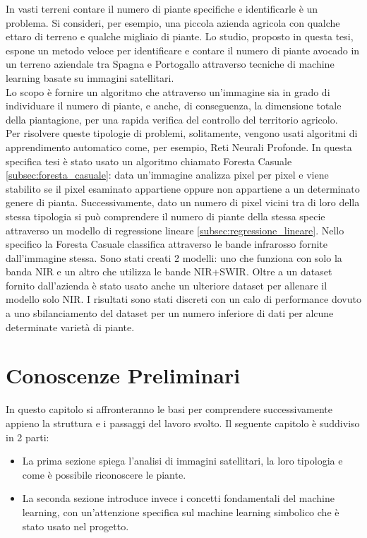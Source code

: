 \documentclass[a4paper, 12pt]{book}
\newcommand{\setupfancy}{
    \pagestyle{fancy}
    \fancyhf{}
    \renewcommand{\headrulewidth}{2pt}
    \fancyhead[EL]{\textbf{\textsf{\nouppercase\thepage}}}
    \fancyhead[ER]{\textbf{\textsf{\nouppercase\leftmark}}}
    \fancyhead[OR]{\textbf{\textsf{\nouppercase\thepage}}}
    \fancyhead[OL]{\textbf{\textsf{\nouppercase{\rightmark}}}}
}
\begin{document}
\thispagestyle{empty} %
In vasti terreni contare il numero di piante specifiche e identificarle è un problema. 
Si consideri, per esempio, una piccola azienda agricola con qualche ettaro di terreno e qualche migliaio di piante.
Lo studio, proposto in questa tesi, espone un metodo veloce per identificare e contare il numero di piante avocado in un terreno aziendale tra Spagna e Portogallo attraverso tecniche di machine learning basate su immagini satellitari.\\
Lo scopo è fornire un algoritmo che attraverso un'immagine sia in grado di individuare il numero di piante, e anche, di conseguenza, la dimensione totale della piantagione, per una rapida verifica del controllo del territorio agricolo.\\
Per risolvere queste tipologie di problemi, solitamente, vengono usati algoritmi di apprendimento automatico come, per esempio, Reti Neurali Profonde.
In questa specifica tesi è stato usato un algoritmo chiamato Foresta Casuale \ref{subsec:foresta_casuale}:
data un'immagine analizza pixel per pixel e viene stabilito se il pixel esaminato appartiene oppure non appartiene a un determinato genere di pianta.
Successivamente, dato un numero di pixel vicini tra di loro della stessa tipologia si può comprendere il numero di piante della stessa specie attraverso un modello di regressione lineare \ref{subsec:regressione_lineare}.
Nello specifico la Foresta Casuale classifica attraverso le bande infrarosso fornite dall'immagine stessa. Sono stati creati 2 modelli: uno che funziona con solo la banda NIR e un altro che utilizza le bande NIR+SWIR.
Oltre a un dataset fornito dall'azienda è stato usato anche 
un ulteriore dataset \cite{guillem_montalban_faet_2025_17866344} per allenare il modello solo NIR.
I risultati sono stati discreti con un calo di performance 
dovuto a uno sbilanciamento del dataset per un numero inferiore di dati per alcune determinate varietà di piante.


\thispagestyle{empty} %
\clearpage
\pagestyle{empty}
\chapter{Conoscenze Preliminari}
\setupfancy
\thispagestyle{empty}
In questo capitolo si affronteranno le basi per comprendere successivamente appieno la struttura e i passaggi del lavoro svolto.
Il seguente capitolo è suddiviso in 2 parti:
\begin{itemize}
  \item La prima sezione spiega l'analisi di immagini satellitari, la loro tipologia e come è possibile riconoscere le piante. 
  \item La seconda sezione introduce invece i concetti fondamentali del machine learning, con un'attenzione specifica sul machine learning simbolico che è stato usato nel progetto.
\end{itemize} 
\end{document}
